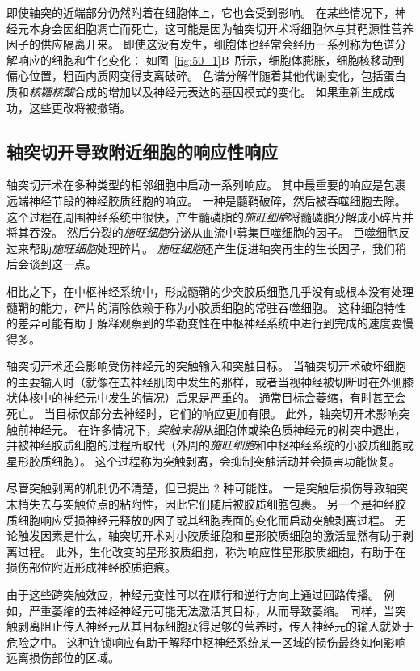 即使轴突的近端部分仍然附着在细胞体上，它也会受到影响。
在某些情况下，神经元本身会因细胞凋亡而死亡，这可能是因为轴突切开术将细胞体与其靶源性营养因子的供应隔离开来。
即使这没有发生，细胞体也经常会经历一系列称为色谱分解响应的细胞和生化变化：
如图~\ref{fig:50_1}B~所示，细胞体膨胀，细胞核移动到偏心位置，粗面内质网变得支离破碎。
色谱分解伴随着其他代谢变化，包括蛋白质和\textit{核糖核酸}合成的增加以及神经元表达的基因模式的变化。
如果重新生成成功，这些更改将被撤销。



\subsection{轴突切开导致附近细胞的响应性响应}

轴突切开术在多种类型的相邻细胞中启动一系列响应。
其中最重要的响应是包裹远端神经节段的神经胶质细胞的响应。
一种是髓鞘破碎，然后被吞噬细胞去除。
这个过程在周围神经系统中很快，产生髓磷脂的\textit{施旺细胞}将髓磷脂分解成小碎片并将其吞没。
然后分裂的\textit{施旺细胞}分泌从血流中募集巨噬细胞的因子。
巨噬细胞反过来帮助\textit{施旺细胞}处理碎片。
\textit{施旺细胞}还产生促进轴突再生的生长因子，我们稍后会谈到这一点。


相比之下，在中枢神经系统中，形成髓鞘的少突胶质细胞几乎没有或根本没有处理髓鞘的能力，碎片的清除依赖于称为小胶质细胞的常驻吞噬细胞。
这种细胞特性的差异可能有助于解释观察到的华勒变性在中枢神经系统中进行到完成的速度要慢得多。


轴突切开术还会影响受伤神经元的突触输入和突触目标。
当轴突切开术破坏细胞的主要输入时（就像在去神经肌肉中发生的那样，或者当视神经被切断时在外侧膝状体核中的神经元中发生的情况）后果是严重的。
通常目标会萎缩，有时甚至会死亡。
当目标仅部分去神经时，它们的响应更加有限。
此外，轴突切开术影响突触前神经元。
在许多情况下，\textit{突触末稍}从细胞体或染色质神经元的树突中退出，并被神经胶质细胞的过程所取代（外周的\textit{施旺细胞}和中枢神经系统的小胶质细胞或星形胶质细胞）。
这个过程称为突触剥离，会抑制突触活动并会损害功能恢复。


尽管突触剥离的机制仍不清楚，但已提出 2 种可能性。
一是突触后损伤导致轴突末梢失去与突触位点的粘附性，因此它们随后被胶质细胞包裹。
另一个是神经胶质细胞响应受损神经元释放的因子或其细胞表面的变化而启动突触剥离过程。
无论触发因素是什么，轴突切开术对小胶质细胞和星形胶质细胞的激活显然有助于剥离过程。
此外，生化改变的星形胶质细胞，称为响应性星形胶质细胞，有助于在损伤部位附近形成神经胶质疤痕。


由于这些跨突触效应，神经元变性可以在顺行和逆行方向上通过回路传播。
例如，严重萎缩的去神经神经元可能无法激活其目标，从而导致萎缩。
同样，当突触剥离阻止传入神经元从其目标细胞获得足够的营养时，传入神经元的输入就处于危险之中。
这种连锁响应有助于解释中枢神经系统某一区域的损伤最终如何影响远离损伤部位的区域。



